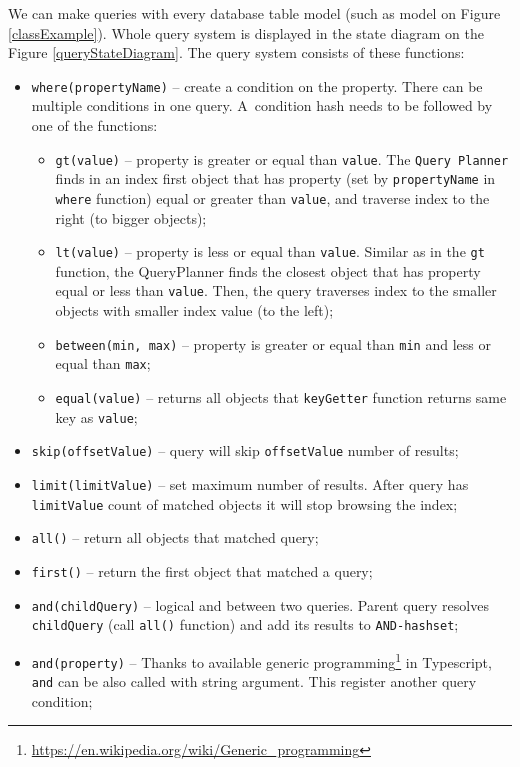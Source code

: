 We can make queries with every database table model (such as model on Figure \ref{classExample}). Whole query system is displayed in the state diagram on the Figure \ref{queryStateDiagram}. The query system consists of these functions: 
\begin{itemize}
    \item \texttt{where(propertyName)} -- create a condition on the property. There can be multiple conditions in one query. A~condition hash needs to be followed by one of the functions: 
    \begin{itemize}
        \item \texttt{gt(value)} -- property is greater or equal than \texttt{value}. The \texttt{Query Planner} finds in an index first object that has property (set by \texttt{propertyName} in \texttt{where} function) equal or greater than \texttt{value}, and traverse index to the right (to bigger objects);
        \item \texttt{lt(value)} -- property is less or equal than \texttt{value}. Similar as in the \texttt{gt} function, the QueryPlanner finds the closest object that has property equal or less than \texttt{value}. Then, the query traverses index to the smaller objects with smaller index value (to the left);
        \item \texttt{between(min, max)} -- property is greater or equal than \texttt{min} and less or equal than \texttt{max};
        \item \texttt{equal(value)} -- returns all objects that \texttt{keyGetter} function returns same key as \texttt{value};
    \end{itemize}
    \item \texttt{skip(offsetValue)} -- query will skip \texttt{offsetValue} number of results;
    \item \texttt{limit(limitValue)} -- set maximum number of results. After query has \texttt{limitValue} count of matched objects it will stop browsing the index;
    \item \texttt{all()} -- return all objects that matched query;
    \item \texttt{first()} -- return the first object that matched a query;
    \item \texttt{and(childQuery)} -- logical and between two queries. Parent query resolves \texttt{childQuery} (call \texttt{all()} function) and add its results to \texttt{AND-hashset};
    \item \texttt{and(property)} -- Thanks to available generic programming\footnote{\url{https://en.wikipedia.org/wiki/Generic_programming}} in Typescript, \texttt{and} can be also called with string argument. This register another query condition;

\end{itemize}
